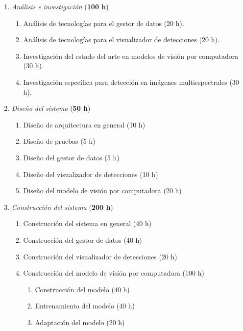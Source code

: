 \documentclass[
11pt, %
]{charter}
\begin{document}
\begin{enumerate}
  \item \textit{Análisis e investigación} (\textbf{100 h})
        \begin{enumerate}
          \item Análisis de tecnologías para el gestor de datos (20 h).
          \item Análisis de tecnologías para el visualizador de detecciones (20 h).
          \item Investigación del estado del arte en modelos de visión por computadora (30 h).
          \item Investigación específica para detección en imágenes multiespectrales (30 h).
        \end{enumerate}

  \item \textit{Diseño del sistema} (\textbf{50 h})
        \begin{enumerate}
          \item Diseño de arquitectura en general (10 h)
          \item Diseño de pruebas (5 h)
          \item Diseño del gestor de datos (5 h)
          \item Diseño del visualizador de detecciones (10 h)
          \item Diseño del modelo de visión por computadora (20 h)
        \end{enumerate}

  \item \textit{Construcción del sistema} (\textbf{200 h})
        \begin{enumerate}
          \item Construcción del sistema en general (40 h)
          \item Construcción del gestor de datos (40 h)
          \item Construcción del visualizador de detecciones (20 h)
          \item Construcción del modelo de visión por computadora (100 h)
                \begin{enumerate}
                  \item Construcción del modelo (40 h)
                  \item Entrenamiento del modelo (40 h)
                  \item Adaptación del modelo (20 h)
                \end{enumerate}
        \end{enumerate}


\end{enumerate}
\end{document}
